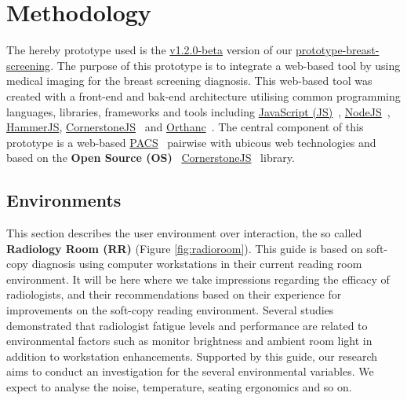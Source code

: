 
\section{Methodology}

The hereby prototype used is the \hyperlink{https://github.com/MIMBCD-UI/prototype-breast-screening/releases/tag/v1.2.0-beta}{v1.2.0-beta} version of our \hyperlink{https://github.com/MIMBCD-UI/prototype-breast-screening/}{prototype-breast-screening}. The purpose of this prototype is to integrate a web-based tool by using medical imaging for the breast screening diagnosis. This web-based tool was created with a front-end and bak-end architecture utilising common programming languages, libraries, frameworks and tools including \hyperlink{https://www.javascript.com/}{JavaScript (JS)}~\cite{flanagan2006javascript}, \hyperlink{https://nodejs.org/}{NodeJS}~\cite{wilson2018node}, \hyperlink{https://hammerjs.github.io/}{HammerJS}, \hyperlink{https://cornerstonejs.org/}{CornerstoneJS}~\cite{hostetter2018integration} and \hyperlink{https://www.orthanc-server.com/}{Orthanc}~\cite{Jodogne:ISBI2013}. The central component of this prototype is a web-based \hyperlink{https://www.sciencedirect.com/topics/medicine-and-dentistry/picture-archiving-and-communication-system}{PACS}~\cite{cooke2003picture} pairwise with ubicous web technologies and based on the \textbf{Open Source (OS)}~\cite{feller2002understanding} \hyperlink{https://cornerstonejs.org/}{CornerstoneJS}~\cite{hostetter2018integration} library.


\subsection{Environments}

This section describes the user environment over interaction, the so called \textbf{Radiology Room (RR)} (Figure \ref{fig:radioroom}). This guide is based on soft-copy diagnosis using computer workstations in their current reading room environment. It will be here where we take impressions regarding the efficacy of radiologists, and their recommendations based on their experience for improvements on the soft-copy reading environment. Several studies demonstrated that radiologist fatigue levels and performance are related to environmental factors such as monitor brightness and ambient room light in addition to workstation enhancements. Supported by this guide, our research aims to conduct an investigation for the several environmental variables. We expect to analyse the noise, temperature, seating ergonomics and so on.

